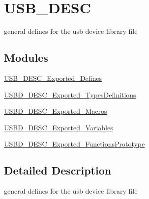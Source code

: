 \hypertarget{group__USB__DESC}{\section{U\-S\-B\-\_\-\-D\-E\-S\-C}
\label{group__USB__DESC}
}


general defines for the usb device library file  


\subsection*{Modules}
\begin{DoxyCompactItemize}
\item 
\hyperlink{group__USB__DESC__Exported__Defines}{U\-S\-B\-\_\-\-D\-E\-S\-C\-\_\-\-Exported\-\_\-\-Defines}
\item 
\hyperlink{group__USBD__DESC__Exported__TypesDefinitions}{U\-S\-B\-D\-\_\-\-D\-E\-S\-C\-\_\-\-Exported\-\_\-\-Types\-Definitions}
\item 
\hyperlink{group__USBD__DESC__Exported__Macros}{U\-S\-B\-D\-\_\-\-D\-E\-S\-C\-\_\-\-Exported\-\_\-\-Macros}
\item 
\hyperlink{group__USBD__DESC__Exported__Variables}{U\-S\-B\-D\-\_\-\-D\-E\-S\-C\-\_\-\-Exported\-\_\-\-Variables}
\item 
\hyperlink{group__USBD__DESC__Exported__FunctionsPrototype}{U\-S\-B\-D\-\_\-\-D\-E\-S\-C\-\_\-\-Exported\-\_\-\-Functions\-Prototype}
\end{DoxyCompactItemize}


\subsection{Detailed Description}
general defines for the usb device library file 